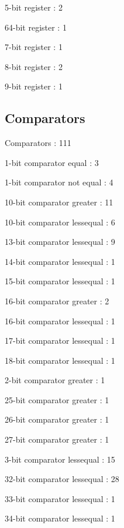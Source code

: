 \documentclass[letterpaper, 11 pt, conference]{article}
\begin{document}
 5-bit register                                        : 2

 64-bit register                                       : 1

 7-bit register                                        : 1

 8-bit register                                        : 2

 9-bit register                                        : 1

\subsection{ Comparators }
Comparators                                          : 111

 1-bit comparator equal                                : 3

 1-bit comparator not equal                            : 4

 10-bit comparator greater                             : 11

 10-bit comparator lessequal                           : 6

 13-bit comparator lessequal                           : 9

 14-bit comparator lessequal                           : 1

 15-bit comparator lessequal                           : 1

 16-bit comparator greater                             : 2

 16-bit comparator lessequal                           : 1

 17-bit comparator lessequal                           : 1

 18-bit comparator lessequal                           : 1

 2-bit comparator greater                              : 1

 25-bit comparator greater                             : 1

 26-bit comparator greater                             : 1

 27-bit comparator greater                             : 1

 3-bit comparator lessequal                            : 15

 32-bit comparator lessequal                           : 28

 33-bit comparator lessequal                           : 1

 34-bit comparator lessequal                           : 1
\end{document}
